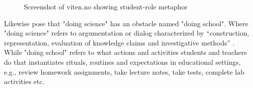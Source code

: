 \begin{figure}
\centering
\caption{Screenshot of viten.no showing student-role metaphor}
\label{fig:scrshotviten}
\end{figure}

Likewise \citet{jimenez2000doing} pose that "doing science" has an obstacle named "doing school". Where "doing science" refers to argumentation or dialog characterized by “construction, representation, evaluation of knowledge claims and investigative methods” \citep{jimenez2000doing}. While "doing school" refers to what actions and activities students and teachers do that instantiates rituals, routines and expectations in educational settings, e.g., review homework assignments, take lecture notes, take tests, complete lab activities etc. 

